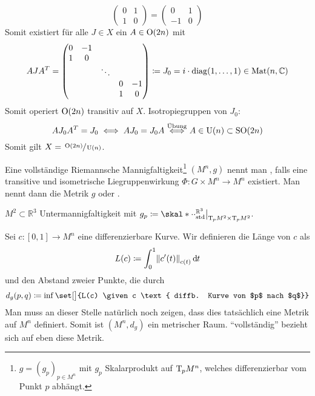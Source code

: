\begin{beispiel*}
\begin{enumerate}[1)]
\[\begin{pmatrix}
				0 & 1 \\
				1 & 0
			\end{pmatrix} = \begin{pmatrix}
				0 & 1 \\ -1 & 0
			\end{pmatrix}
		\]
		Somit existiert für alle $J \in X$ ein $A \in \operatorname{O}(2n)$ mit 
		\[
			A J A^T = \begin{pmatrix}
				0 & -1 & & & \\
				1 & 0 & & & \\
				& & \ddots & & \\
				& & & 0 & -1 \\
				& & & 1 & 0
			\end{pmatrix} \coloneqq J_0 = i \cdot \operatorname{diag}(1, \ldots ,1) \in \operatorname{Mat}(n,\mathbb{C})
		\]
		Somit operiert $\operatorname{O}(2n)$ transitiv auf $X$.
		Isotropiegruppen von $J_0$:
		\[
			A J_0 A^T = J_0 \iff A J_0 = J_0 A \stackrel{\mbox{\scriptsize Übung}}{\iff} A \in \operatorname{U}(n) \subset \operatorname{SO}(2n)
		\]
		Somit gilt $X = \sfrac{\operatorname{O}(2n)}{\operatorname{U}(n)}$.
 	\end{enumerate}
\end{beispiel*}

\begin{definition}
	Eine vollständige Riemannsche Mannigfaltigkeit\footnote{$g= (g_p)_{p \in M^n}$ mit $g_p$ Skalarprodukt auf $\mathrm{T}\mkern-0.85mu_p M^n$, welches differenzierbar vom Punkt $p$ abhängt.} $(M^n,g)$ nennt man , falls eine transitive und isometrische Liegruppenwirkung $\Phi \colon G\times M^n \to M^n$ existiert.
	Man nennt dann die Metrik $g$  oder .
\end{definition}

\begin{beispiel*}
	$M^2 \subset \mathbb{R}^3$ Untermannigfaltigkeit mit $g_p \coloneqq \skal*{\cdot }{\cdot }_{\mathrm{std}}^{\mathbb{R}^3}\big|_{\Tmap_p M^2 \times \Tmap_p M^2}$.
\end{beispiel*}

Sei $c \colon [0,1] \to M^n$ eine differenzierbare Kurve. 
Wir definieren die Länge von $c$ als 
\[
	L(c) \coloneqq \int_0^1 \norm*{c'(t)}_{c(t)} \,\mathd t
\]
und den Abstand zweier Punkte, die   durch 
\[
	d_g(p,q) \coloneqq \inf \set[\big]{L(c) \given c \text{ diffb. Kurve von $p$ nach $q$}}
\]
Man muss an dieser Stelle natürlich noch zeigen, dass dies tatsächlich eine Metrik auf $M^n$ definiert.
Somit ist $(M^n,d_g)$ ein metrischer Raum.
\enquote{vollständig} bezieht sich auf eben diese Metrik.

